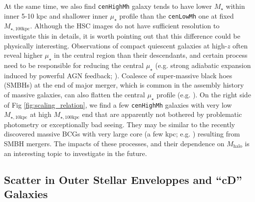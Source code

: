 \documentclass[a4paper,fleqn,usenatbib]{mnras}
\def\rbcg{\texttt{cenHighMh}}
\def\nbcg{\texttt{cenLowMh}}
\def\mstar{{$M_{\star}$}}
\def\mhalo{{$M_{\mathrm{halo}}$}}
\def\minn{{$M_{\star,10\mathrm{kpc}}$}}
\def\mtot{{$M_{\star,100\mathrm{kpc}}$}}
\def\mden{{$\mu_{\star}$}}
\begin{document}
    At the same time, we also find \rbcg{} galaxy tends to have lower \mstar{} within 
    inner 5-10 kpc and shallower inner \mden{} profile than the \nbcg{} one at 
    fixed \mtot{}. 
    Although the HSC images do not have sufficient resolution to investigate this in 
    details, it is worth pointing out that this difference could be physically 
    interesting. 
    Observations of compact quiescent galaxies at high-$z$ often reveal higher 
    \mden{} in the central region than their descendants, and certain process need to  
    be responsible for reducing the central \mden{} (e.g. strong adiabatic expansion 
    induced by powerful AGN feedback; \citealt{Fan2008}).
    Coalesce of super-massive black hoes (SMBHs) at the end of major merger, which is 
    common in the assembly history of massive galaxies, can also flatten the central 
    \mden{} profile (e.g. \citealt{Milosavljevi2002}).
    On the right side of Fig \ref{fig:scaling_relation}, we find a few \rbcg{} galaxies 
    with very low \minn{} at high \mtot{} end that are apparently not bothered by 
    problematic photometry or exceptionally bad seeing.  
    They may be similar to the recently discovered massive BCGs with very large core 
    (a few kpc; e.g. \citealt{Postman2012, LopezCruz2014}) resulting from SMBH mergers.
    The impacts of these processes, and their dependence on \mhalo{} is an interesting 
    topic to investigate in the future.

    
\subsection{Scatter in Outer Stellar Enveloppes and ``cD'' Galaxies}
        
\end{document}
